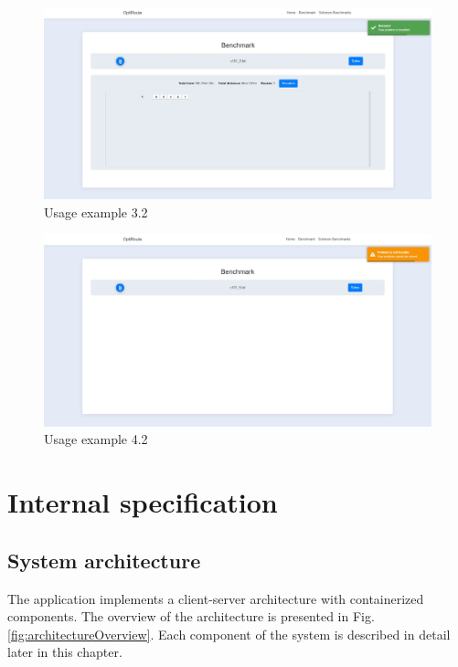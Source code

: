 \documentclass[a4paper,twoside,12pt]{book}
\begin{document}
\begin{figure}[H]
\centering
\includegraphics[width=\textwidth]{images/benchmarkSuccess.jpg}
\caption{Usage example 3.2}
\label{fig:benchmarkSuccess}
\end{figure}

\begin{figure}[H]
\centering
\includegraphics[width=\textwidth]{images/benchmarkFailed.jpg}
\caption{Usage example 4.2}
\label{fig:benchmarkFailed}
\end{figure}


\chapter{Internal specification}

\section{System architecture}
The application implements a client-server architecture with containerized components. The overview of the architecture is presented in Fig. \ref{fig:architectureOverview}. Each component of the system is described in detail later in this chapter.
\end{document}
